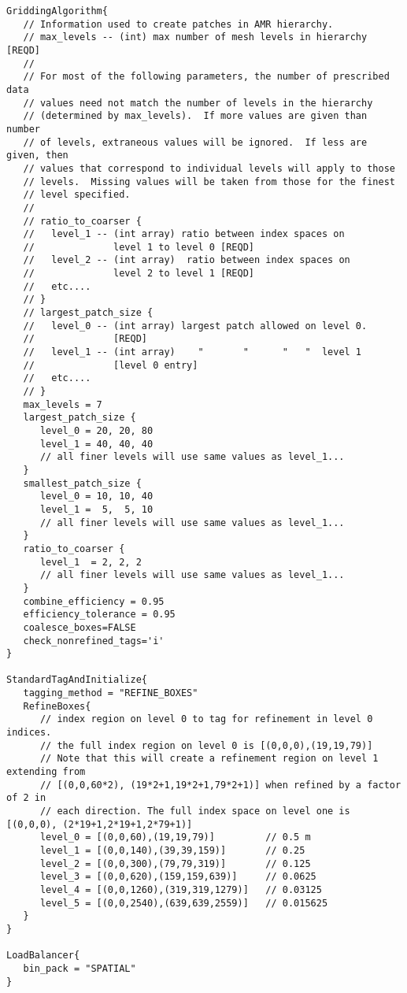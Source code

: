 \documentclass[12pt]{article}
\begin{document}
\begin{verbatim}
GriddingAlgorithm{
   // Information used to create patches in AMR hierarchy.
   // max_levels -- (int) max number of mesh levels in hierarchy [REQD]
   // 
   // For most of the following parameters, the number of prescribed data
   // values need not match the number of levels in the hierarchy 
   // (determined by max_levels).  If more values are given than number 
   // of levels, extraneous values will be ignored.  If less are given, then
   // values that correspond to individual levels will apply to those 
   // levels.  Missing values will be taken from those for the finest
   // level specified.
   //
   // ratio_to_coarser {
   //   level_1 -- (int array) ratio between index spaces on 
   //              level 1 to level 0 [REQD]
   //   level_2 -- (int array)  ratio between index spaces on 
   //              level 2 to level 1 [REQD]
   //   etc....
   // }
   // largest_patch_size {
   //   level_0 -- (int array) largest patch allowed on level 0. 
   //              [REQD]    
   //   level_1 -- (int array)    "       "      "   "  level 1 
   //              [level 0 entry]
   //   etc....                       
   // }
   max_levels = 7 
   largest_patch_size {
      level_0 = 20, 20, 80
      level_1 = 40, 40, 40
      // all finer levels will use same values as level_1...
   }
   smallest_patch_size {
      level_0 = 10, 10, 40
      level_1 =  5,  5, 10
      // all finer levels will use same values as level_1...
   }
   ratio_to_coarser {
      level_1  = 2, 2, 2
      // all finer levels will use same values as level_1...
   }
   combine_efficiency = 0.95
   efficiency_tolerance = 0.95
   coalesce_boxes=FALSE
   check_nonrefined_tags='i'
}

StandardTagAndInitialize{
   tagging_method = "REFINE_BOXES"
   RefineBoxes{
      // index region on level 0 to tag for refinement in level 0 indices.
      // the full index region on level 0 is [(0,0,0),(19,19,79)]
      // Note that this will create a refinement region on level 1 extending from
      // [(0,0,60*2), (19*2+1,19*2+1,79*2+1)] when refined by a factor of 2 in
      // each direction. The full index space on level one is [(0,0,0), (2*19+1,2*19+1,2*79+1)]
      level_0 = [(0,0,60),(19,19,79)]         // 0.5 m
      level_1 = [(0,0,140),(39,39,159)]       // 0.25
      level_2 = [(0,0,300),(79,79,319)]       // 0.125
      level_3 = [(0,0,620),(159,159,639)]     // 0.0625
      level_4 = [(0,0,1260),(319,319,1279)]   // 0.03125
      level_5 = [(0,0,2540),(639,639,2559)]   // 0.015625
   }
}

LoadBalancer{
   bin_pack = "SPATIAL"
}


\end{verbatim}
\end{document}
